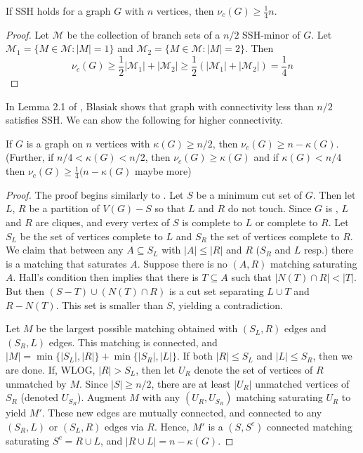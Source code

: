 \begin{prop}
	If SSH holds for a \kfree graph $G$ with $n$ vertices, then $\nu_c(G) \geq \frac{1}{4}n$. 
\end{prop}
\begin{proof}
	Let $\mathcal{M}$ be the collection of branch sets of a $n/2$ SSH-minor of $G$.  Let $\mathcal{M}_1 = \{M\in \mathcal{M}: |M| = 1\}$ and $\mathcal{M}_2 = \{M\in \mathcal{M}: |M| = 2\}$. Then 
\[\nu_c(G) \geq \frac{1}{2}|\mathcal{M}_1| + |\mathcal{M}_2| \geq \frac{1}{2}(|\mathcal{M}_1| + |\mathcal{M}_2|) = \frac{1}{4}n\]
\end{proof}
In Lemma 2.1 of \cite{blas}, Blasiak shows that \kfree graph with connectivity less than $n/2$ satisfies SSH.  We can show the following for higher connectivity.
\begin{lem}
	If $G$ is a \kfree graph on $n$ vertices with $\kappa(G) \geq n/2$, then $\nu_c(G) \geq n-\kappa(G)$.  (Further, if $n/4 < \kappa(G) < n/2$, then $\nu_c(G) \geq \kappa(G)$ and if $\kappa(G) < n/4$ then $\nu_c(G) \geq \frac{1}{4}(n-\kappa(G)$ maybe more) 
\end{lem}
\begin{proof}
	The proof begins similarly to \cite{blas}. Let $S$ be a minimum cut set of $G$.  Then let $L$, $R$ be a partition of $V(G) - S$ so that $L$ and $R$ do not touch.  Since $G$ is \kfree, $L$ and $R$ are cliques, and every vertex of $S$ is complete to $L$ or complete to $R$.  Let $S_L$ be the set of vertices complete to $L$ and $S_R$ the set of vertices complete to $R$.    We claim that between any $A \subseteq S_L$ with $|A| \leq |R|$ and $R$ ($S_R$ and $L$ resp.) there is a matching that saturates $A$.  Suppose there is no $(A, R)$ matching saturating $A$.  Hall's condition then implies that there is $T\subseteq A$ such that $|N(T)\cap R| < |T|$. But then $(S-T)\cup (N(T)\cap R)$ is a cut set separating $L\cup T$ and $R-N(T)$. This set is smaller than $S$, yielding a contradiction.   

Let $M$ be the largest possible matching obtained with $(S_L,R)$ edges and $(S_R,L)$ edges.  This matching is connected, and $|M| = \min\{|S_L|, |R|\} + \min\{|S_R|, |L|\}$.  If both $|R| \leq S_L$ and $|L| \leq S_R$, then we are done.  If, WLOG,  $|R| > S_L$, then let $U_R$ denote the set of vertices of $R$ unmatched by $M$.  Since $|S|\geq n/2$, there are at least $|U_R|$ unmatched vertices of $S_R$ (denoted $U_{S_R}$).  Augment $M$ with any $(U_R , U_{S_R})$ matching saturating $U_R$ to yield $M'$.  These new edges are mutually connected, and connected to any $(S_R,L)$ or $(S_L, R)$ edges via $R$.  Hence, $M'$ is a $(S,S^c)$ connected matching saturating $S^c = R\cup L$, and $|R\cup L| = n-\kappa(G)$. 
\end{proof}



